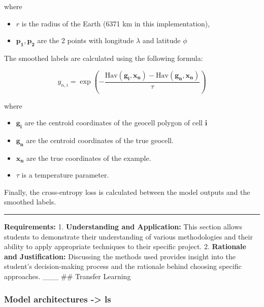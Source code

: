 \documentclass{article}
\providecommand{\tightlist}{%
  \setlength{\itemsep}{0pt}\setlength{\parskip}{0pt}}
\begin{document}
where

\begin{itemize}
\tightlist
\item
  \(r\) is the radius of the Earth (6371 km in this implementation),
\item
  \(\mathbf{p_1}, \mathbf{p_2}\) are the 2 points with longitude
  \(\lambda\) and latitude \(\phi\)
\end{itemize}

The smoothed labels are calculated using the following formula:

\[
y_{n,i} = \exp \left( - \frac{\text{Hav}(\mathbf{g_i}, \mathbf{x_n}) - \text{Hav}(\mathbf{g_n}, \mathbf{x_n})}{\tau} \right)
\]

where

\begin{itemize}
\tightlist
\item
  \(\mathbf{g_i}\)\hspace{0pt} are the centroid coordinates of the
  geocell polygon of cell \(\mathbf{i}\)
\item
  \(\mathbf{g_n}\)\hspace{0pt} are the centroid coordinates of the true
  geocell.
\item
  \(\mathbf{x_n}\)\hspace{0pt} are the true coordinates of the example.
\item
  \(\tau\) is a temperature parameter.
\end{itemize}

Finally, the cross-entropy loss is calculated between the model outputs
and the smoothed labels.

\begin{center}\rule{0.5\linewidth}{0.5pt}\end{center}

\textbf{Requirements:} 1. \textbf{Understanding and Application:} This
section allows students to demonstrate their understanding of various
methodologies and their ability to apply appropriate techniques to their
specific project. 2. \textbf{Rationale and Justification:} Discussing
the methods used provides insight into the student's decision-making
process and the rationale behind choosing specific approaches. \_\_\_
\#\# Transfer Learning

\subsubsection{Model architectures -\textgreater{}
ls}\label{model-architectures---ls}
\end{document}
